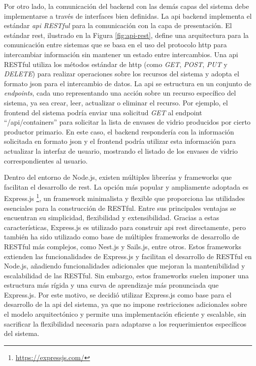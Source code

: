 Por otro lado, la comunicación del backend con las demás capas del sistema debe implementarse a través de interfaces bien definidas. La \acrshort{api} backend implementa el estándar \textit{\acrshort{api} RESTful} para la comunicación con la capa de presentación. El estándar \acrfull{rest}, ilustrado en la Figura \ref{fig:api-rest}, define una arquitectura para la comunicación entre sistemas que se basa en el uso del protocolo \acrshort{http} para intercambiar información sin mantener un estado entre intercambios. Una \acrshort{api} RESTful utiliza los métodos estándar de \acrshort{http} (como \textit{GET}, \textit{POST}, \textit{PUT} y \textit{DELETE}) para realizar operaciones sobre los recursos del sistema y adopta el formato \acrshort{json} para el intercambio de datos. La \acrshort{api} se estructura en un conjunto de \textit{endpoints}, cada uno representando una acción sobre un recurso específico del sistema, ya sea crear, leer, actualizar o eliminar el recurso. Por ejemplo, el frontend del sistema podría enviar una solicitud \textit{GET} al endpoint ``/api/containers'' para solicitar la lista de envases de vidrio producidos por cierto productor primario. En este caso, el backend respondería con la información solicitada en formato \acrshort{json} y el frontend podría utilizar esta información para actualizar la interfaz de usuario, mostrando el listado de los envases de vidrio correspondientes al usuario.

Dentro del entorno de Node.js, existen múltiples librerías y frameworks que facilitan el desarrollo de  \acrshort{rest}. La opción más popular y ampliamente adoptada es Express.js \footnote{\url{https://expressjs.com/}}, un framework minimalista y flexible que proporciona las utilidades esenciales para la construcción de  RESTful. Entre sus principales ventajas se encuentran su simplicidad, flexibilidad y extensibilidad. Gracias a estas características, Express.js es utilizado para construir \acrshort{api} \acrshort{rest} directamente, pero también ha sido utilizado como base de múltiples frameworks de desarrollo de  RESTful más complejos, como Nest.js y Sails.js, entre otros. Estos frameworks extienden las funcionalidades de Express.js y facilitan el desarrollo de  RESTful en Node.js, añadiendo funcionalidades adicionales que mejoran la mantenibilidad y escalabilidad de las  RESTful. Sin embargo, estos frameworks suelen imponer una estructura más rígida y una curva de aprendizaje más pronunciada que Express.js. Por este motivo, se decidió utilizar Express.js como base para el desarrollo de la \acrshort{api} del sistema, ya que no impone restricciones adicionales sobre el modelo arquitectónico y permite una implementación eficiente y escalable, sin sacrificar la flexibilidad necesaria para adaptarse a los requerimientos específicos del sistema.

